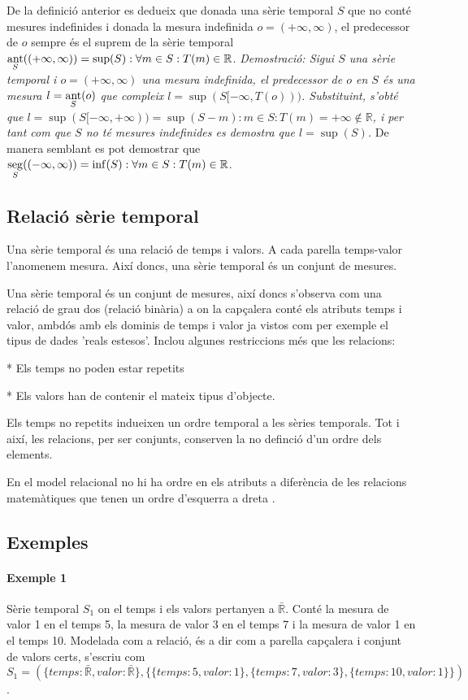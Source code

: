 De la definició anterior es dedueix que donada una sèrie temporal $S$
que no conté mesures indefinides i donada la mesura indefinida
$o=(+\infty,\infty)$, el predecessor de $o$ sempre és el suprem de la
sèrie temporal $\operatorname*{ant}\limits_S( (+\infty,\infty) ) = \sup(S): \forall
m\in S: T(m)\in\mathbb{R}$.  %
\emph{Demostració: Sigui $S$ una sèrie temporal i $o=(+\infty,\infty)$
  una mesura indefinida, el predecessor de $o$ en $S$ és una mesura
  $l=\operatorname*{ant}\limits_S(o)$ que compleix
  $l=\sup(S[-\infty,T(o)))$. Substituint, s'obté que
  $l=\sup(S[-\infty,+\infty))=\sup(S-m):m\in S:T(m)=+\infty \notin
  \mathbb{R}$, i per tant com que $S$ no té mesures indefinides es
  demostra que $l=\sup(S)$.  } De manera semblant es pot demostrar que
$\operatorname*{seg}\limits_S( (-\infty,\infty) ) = \inf(S): \forall m\in S:
T(m)\in\mathbb{R}$.




\subsection{Relació sèrie temporal}

Una sèrie temporal és una relació de temps i valors. A cada parella temps-valor l'anomenem mesura. Així doncs, una sèrie temporal és un conjunt de mesures.

Una sèrie temporal és un conjunt de mesures, així doncs s'observa com una relació de grau dos (relació binària)  a on la capçalera conté els atributs temps i valor, ambdós amb els dominis de temps i valor ja vistos com per exemple el tipus de dades 'reals estesos'. Inclou algunes restriccions més que les relacions:

* Els temps no poden estar repetits

* Els valors han de contenir el mateix tipus d'objecte.

Els temps no repetits indueixen un ordre temporal a les sèries temporals. Tot i així, les relacions, per ser conjunts, conserven la no definció d'un ordre dels elements. 


En el model relacional no hi ha ordre en els atributs a diferència de les relacions matemàtiques que tenen un ordre d'esquerra a dreta \parencite[sec.\ 5.3]{date}.

\subsection{Exemples}

\paragraph{Exemple 1}
Sèrie temporal $S_1$ on el temps i els valors pertanyen a $\bar{\mathbb{R}}$. Conté la mesura de valor 1 en el temps 5, la mesura de valor 3 en el temps 7 i la mesura de valor 1 en el temps 10. Modelada com a relació, és a dir com a parella capçalera i conjunt de valors certs, s'escriu com 
$S_1 = ( \{temps: \bar{\mathbb{R}}, valor: \bar{\mathbb{R}}\}, \{ \{temps:5,valor:1\}, \{temps:7,valor:3\}, \{temps:10,valor:1\} \} )$.

